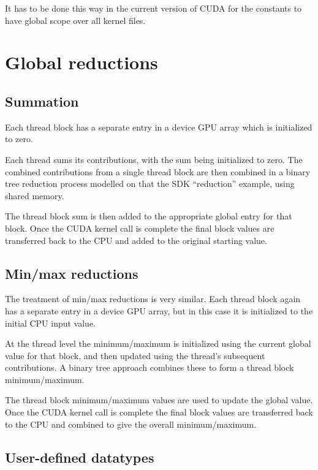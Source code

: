 \documentclass[12pt]{article}
\begin{document}
It has to be done this way in the current version of CUDA for the 
constants to have global scope over all kernel files.

\newpage

\section{Global reductions}

\subsection{Summation}

Each thread block has a separate entry in a device GPU array which is 
initialized to zero.

Each thread sums its contributions, with the sum being initialized to zero.
The combined contributions from a single thread block are then combined 
in a binary tree reduction process modelled on that the SDK ``reduction'' 
example, using shared memory.  

The thread block sum is then added to the appropriate global entry for that 
block.  Once the CUDA kernel call is complete the final block values are 
transferred back to the CPU and added to the original starting value.

\subsection{Min/max reductions}

The treatment of min/max reductions is very similar. Each thread block 
again has a separate entry in a device GPU array, but in this case 
it is initialized to the initial CPU input value.

At the thread level the minimum/maximum is initialized using the current 
global value for that block, and then updated using the thread's subsequent 
contributions.  A binary tree approach combines these to form a thread 
block minimum/maximum.

The thread block minimum/maximum values are used to update the global value.
Once the CUDA kernel call is complete the final block values are transferred 
back to the CPU and combined to give the overall minimum/maximum.

\subsection{User-defined datatypes}
\end{document}
